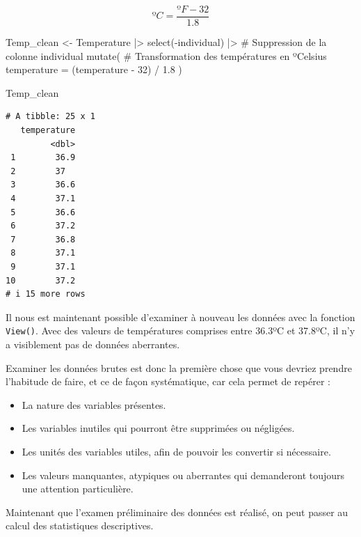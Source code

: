 \documentclass[
  french,
  a4paper,
  DIV=11,
  numbers=noendperiod,
  oneside]{scrreprt}
\newenvironment{Shaded}{}{}
\newcommand{\AttributeTok}[1]{\textcolor[rgb]{0.84,0.23,0.29}{#1}}
\newcommand{\CommentTok}[1]{\textcolor[rgb]{0.42,0.45,0.49}{#1}}
\newcommand{\DecValTok}[1]{\textcolor[rgb]{0.00,0.36,0.77}{#1}}
\newcommand{\FloatTok}[1]{\textcolor[rgb]{0.00,0.36,0.77}{#1}}
\newcommand{\FunctionTok}[1]{\textcolor[rgb]{0.44,0.26,0.76}{#1}}
\newcommand{\NormalTok}[1]{\textcolor[rgb]{0.14,0.16,0.18}{#1}}
\newcommand{\OtherTok}[1]{\textcolor[rgb]{0.44,0.26,0.76}{#1}}
\newcommand{\SpecialCharTok}[1]{\textcolor[rgb]{0.00,0.36,0.77}{#1}}
\providecommand{\tightlist}{%
  \setlength{\itemsep}{0pt}\setlength{\parskip}{0pt}}
\begin{document}
\[ºC = \frac{ºF - 32}{1.8}\]

\begin{Shaded}
\begin{Highlighting}[]
\NormalTok{Temp\_clean }\OtherTok{\textless{}{-}}\NormalTok{ Temperature }\SpecialCharTok{|\textgreater{}}
  \FunctionTok{select}\NormalTok{(}\SpecialCharTok{{-}}\NormalTok{individual) }\SpecialCharTok{|\textgreater{}}      \CommentTok{\# Suppression de la colonne \textasciigrave{}individual\textasciigrave{}}
  \FunctionTok{mutate}\NormalTok{(                      }\CommentTok{\# Transformation des températures en ºCelsius}
    \AttributeTok{temperature =}\NormalTok{ (temperature }\SpecialCharTok{{-}} \DecValTok{32}\NormalTok{) }\SpecialCharTok{/} \FloatTok{1.8}
\NormalTok{    )}

\NormalTok{Temp\_clean}
\end{Highlighting}
\end{Shaded}

\begin{verbatim}
# A tibble: 25 x 1
   temperature
         <dbl>
 1        36.9
 2        37  
 3        36.6
 4        37.1
 5        36.6
 6        37.2
 7        36.8
 8        37.1
 9        37.1
10        37.2
# i 15 more rows
\end{verbatim}

Il nous est maintenant possible d'examiner à nouveau les données avec la
fonction \texttt{View()}. Avec des valeurs de températures comprises
entre 36.3ºC et 37.8ºC, il n'y a visiblement pas de données aberrantes.

Examiner les données brutes est donc la première chose que vous devriez
prendre l'habitude de faire, et ce de façon systématique, car cela
permet de repérer :

\begin{itemize}
\tightlist
\item
  La nature des variables présentes.
\item
  Les variables inutiles qui pourront être supprimées ou négligées.
\item
  Les unités des variables utiles, afin de pouvoir les convertir si
  nécessaire.
\item
  Les valeurs manquantes, atypiques ou aberrantes qui demanderont
  toujours une attention particulière.
\end{itemize}

Maintenant que l'examen préliminaire des données est réalisé, on peut
passer au calcul des statistiques descriptives.
\end{document}
